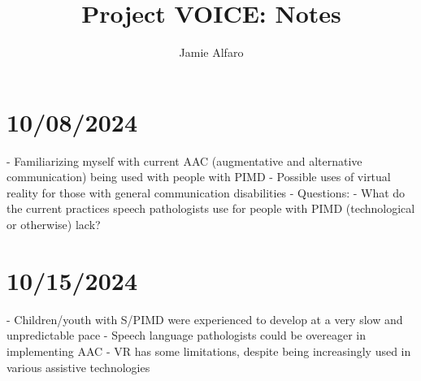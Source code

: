 \documentclass{article}
\author{Jamie Alfaro}
\title{Project VOICE: Notes}
\begin{document}
	
	\maketitle
	
	\section{10/08/2024}
	- Familiarizing myself with current AAC (augmentative and alternative communication) being used with people with PIMD
    - Possible uses of virtual reality for those with general communication disabilities
    - Questions: 
        - What do the current practices speech pathologists use for people with PIMD (technological or otherwise) lack?

	
	\section{10/15/2024}
	- Children/youth with S/PIMD were experienced to develop at a very slow and unpredictable pace
	- Speech language pathologists could be overeager in implementing AAC
	- VR has some limitations, despite being increasingly used in various assistive technologies

	
	
\end{document}
